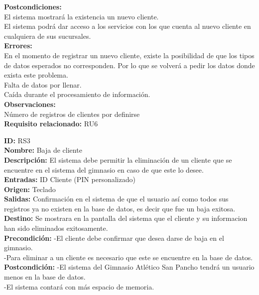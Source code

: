 \textbf{Postcondiciones:}\\
El sistema mostrará la existencia un nuevo cliente. \\
El sistema podrá dar acceso a los servicios con los que cuenta al nuevo cliente en cualquiera de sus sucursales.\\

\textbf{Errores:}\\

En el momento de registrar un nuevo cliente, existe la posibilidad de que los tipos de datos esperados  no corresponden. Por lo que se volverá a pedir los datos donde exista este problema.\\
Falta de datos por llenar.\\
Caída durante el procesamiento de información.\\

\textbf{Observaciones:}\\
      Número de registros de clientes por definirse \\
\textbf{Requisito relacionado: }RU6		\\
\vspace*{0.2in}

\textbf{ID:} RS3\\
\textbf{Nombre:} Baja de cliente\\
\textbf{Descripción:} El sistema debe permitir la eliminación de un cliente que se encuentre en el sistema del gimnasio en caso de que este lo desee.\\

\textbf{Entradas: }
ID Cliente (PIN personalizado)\\
\textbf{Origen:} Teclado\\
\textbf{Salidas:} Confirmación en el sistema de que el usuario así como todos sus registros ya no existen en la base de datos, es decir que fue un baja exitosa.\\
\textbf{Destino:} Se mostrara en la pantalla del sistema que el cliente y su informacion han sido eliminados exitosamente.\\
\textbf{Precondición: }
-El cliente debe confirmar que desea darse de baja en el gimnasio.\\
-Para eliminar a un cliente es necesario que este se encuentre en la base de datos. \\
\textbf{Postcondición: }
-El sistema del Gimnasio Atlético San Pancho tendrá un usuario menos en la base de datos.\\
-El sistema contará con más espacio de memoria.\\

